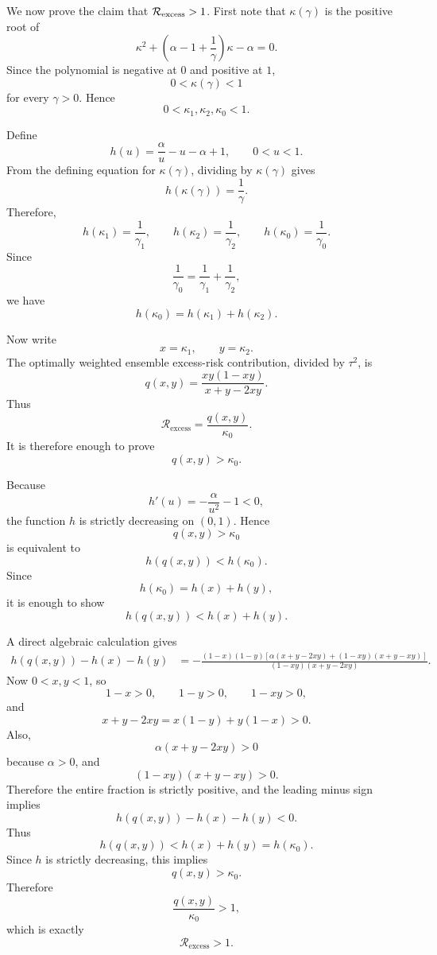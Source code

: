 \documentclass{article}
\theoremstyle{plain}
\theoremstyle{remark}
\begin{document}
We now prove the claim that $\mathcal{R}_{\rm excess}>1$. First note that $\kappa(\gamma)$ is the positive root of
\[
    \kappa^2+
    \left(
        \alpha-1+\frac{1}{\gamma}
    \right)\kappa
    -
    \alpha
    =
    0.
\]
Since the polynomial is negative at $0$ and positive at $1$,
\[
    0<\kappa(\gamma)<1
\]
for every $\gamma>0$. Hence
\[
    0<\kappa_1,\kappa_2,\kappa_0<1.
\]

Define
\[
    h(u)
    =
    \frac{\alpha}{u}-u-\alpha+1,
    \qquad
    0<u<1.
\]
From the defining equation for $\kappa(\gamma)$, dividing by
$\kappa(\gamma)$ gives
\[
    h(\kappa(\gamma))
    =
    \frac{1}{\gamma}.
\]
Therefore,
\[
    h(\kappa_1)=\frac{1}{\gamma_1},
    \qquad
    h(\kappa_2)=\frac{1}{\gamma_2},
    \qquad
    h(\kappa_0)=\frac{1}{\gamma_0}.
\]
Since
\[
    \frac{1}{\gamma_0}
    =
    \frac{1}{\gamma_1}
    +
    \frac{1}{\gamma_2},
\]
we have
\[
    h(\kappa_0)
    =
    h(\kappa_1)+h(\kappa_2).
\]

Now write
\[
    x=\kappa_1,
    \qquad
    y=\kappa_2.
\]
The optimally weighted ensemble excess-risk contribution, divided by
$\tau^2$, is
\[
    q(x,y)
    =
    \frac{
    xy(1-xy)
    }{
    x+y-2xy
    }.
\]
Thus
\[
    \mathcal R_{\mathrm{excess}}
    =
    \frac{q(x,y)}{\kappa_0}.
\]
It is therefore enough to prove
\[
    q(x,y)>\kappa_0.
\]

Because
\[
    h'(u)
    =
    -\frac{\alpha}{u^2}-1<0,
\]
the function $h$ is strictly decreasing on $(0,1)$. Hence
\[
    q(x,y)>\kappa_0
\]
is equivalent to
\[
    h(q(x,y))<h(\kappa_0).
\]
Since
\[
    h(\kappa_0)=h(x)+h(y),
\]
it is enough to show
\[
    h(q(x,y))<h(x)+h(y).
\]

A direct algebraic calculation gives
\[
\begin{aligned}
    h(q(x,y))-h(x)-h(y)
    &=
    -
    \frac{
    (1-x)(1-y)
    \left[
        \alpha(x+y-2xy)
        +(1-xy)(x+y-xy)
    \right]
    }{
    (1-xy)(x+y-2xy)
    }.
\end{aligned}
\]
Now \(0<x,y<1\), so
\[
    1-x>0,
    \qquad
    1-y>0,
    \qquad
    1-xy>0,
\]
and
\[
    x+y-2xy
    =
    x(1-y)+y(1-x)>0.
\]
Also,
\[
    \alpha(x+y-2xy)>0
\]
because \(\alpha>0\), and
\[
    (1-xy)(x+y-xy)>0.
\]
Therefore the entire fraction is strictly positive, and the leading
minus sign implies
\[
    h(q(x,y))-h(x)-h(y)<0.
\]
Thus
\[
    h(q(x,y))<h(x)+h(y)=h(\kappa_0).
\]
Since \(h\) is strictly decreasing, this implies
\[
    q(x,y)>\kappa_0.
\]
Therefore
\[
    \frac{q(x,y)}{\kappa_0}>1,
\]
which is exactly
\[
    \mathcal R_{\mathrm{excess}}>1.
\]







%
\end{document}
